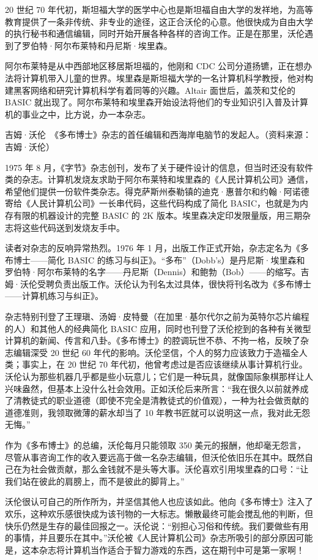 \documentclass[12pt,UTF8]{ctexbook}
\begin{document}
20 世纪 70 年代初，斯坦福大学的医学中心也是斯坦福自由大学的发祥地，为高等教育提供了一条非传统、非专业的途径，这正合沃伦的心意。他很快成为自由大学的执行秘书和通信编辑，同时开始开展各种各样的咨询工作。正是在那里，沃伦遇到了罗伯特·阿尔布莱特和丹尼斯·埃里森。

阿尔布莱特是从中西部地区移居斯坦福的，他刚和 CDC 公司分道扬镳，正在想办法将计算机带入儿童的世界。埃里森是斯坦福大学的一名计算机科学教授，他对构建黑客网络和研究计算机科学有着同等的兴趣。Altair 面世后，盖茨和艾伦的 BASIC 就出现了。阿尔布莱特和埃里森开始设法将他们的专业知识引入普及计算机的事业之中，比方说，办一本杂志。



吉姆·沃伦　《多布博士》杂志的首任编辑和西海岸电脑节的发起人。（资料来源：吉姆·沃伦）

1975 年 8 月，《字节》杂志创刊，发布了关于硬件设计的信息，但当时还没有软件类的杂志。计算机发烧友求助于阿尔布莱特和埃里森的《人民计算机公司》通信，希望他们提供一份软件类杂志。得克萨斯州泰勒镇的迪克·惠普尔和约翰·阿诺德寄给《人民计算机公司》一长串代码，这些代码构成了简化 BASIC，也就是为内存有限的机器设计的完整 BASIC 的 2K 版本。埃里森决定印发限量版，用三期杂志将这些代码送到发烧友手中。

读者对杂志的反响异常热烈。1976 年 1 月，出版工作正式开始，杂志定名为《多布博士——简化 BASIC 的练习与纠正》。“多布”（Dobb's）是丹尼斯·埃里森和罗伯特·阿尔布莱特的名字——丹尼斯（Dennis）和鲍勃（Bob）——的缩写。吉姆·沃伦受聘负责出版工作。沃伦认为刊名太过具体，很快将刊名改为《多布博士——计算机练习与纠正》。

杂志特别刊登了王理瑱、汤姆·皮特曼（在加里·基尔代尔之前为英特尔芯片编程的人）和其他人的经典简化 BASIC 应用，同时也刊登了沃伦挖到的各种有关微型计算机的新闻、传言和八卦。《多布博士》的腔调玩世不恭、不拘一格，反映了杂志编辑深受 20 世纪 60 年代的影响。沃伦坚信，个人的努力应该致力于造福全人类；事实上，在 20 世纪 70 年代初，他曾考虑过是否应该继续从事计算机行业。沃伦认为那些机器几乎都是些小玩意儿；它们是一种玩具，就像国际象棋那样让人兴味盎然，但基本上没什么社会效用。正如沃伦后来所言：“我在很久以前就养成了清教徒式的职业道德（即使不完全是清教徒式的价值观），一种为社会做贡献的道德准则，我领取微薄的薪水却当了 10 年教书匠就可以说明这一点，我对此无怨无悔。”

作为《多布博士》的总编，沃伦每月只能领取 350 美元的报酬，他却毫无怨言，尽管从事咨询工作的收入要远高于做一名杂志编辑，但沃伦依旧乐在其中。既然自己在为社会做贡献，那么金钱就不是头等大事。沃伦喜欢引用埃里森的口号：“让我们站在彼此的肩膀上，而不是彼此的脚背上。”

沃伦很认可自己的所作所为，并坚信其他人也应该如此。他向《多布博士》注入了欢乐，这种欢乐感很快成为该刊物的一大标志。懒散最终可能会搅乱他的判断，但快乐仍然是生存的最佳回报之一。沃伦说：“别担心习俗和传统。我们要做些有用的事情，并且要乐在其中。”沃伦被《人民计算机公司》杂志所吸引的部分原因可能是，这本杂志将计算机当作适合于智力游戏的东西，这在期刊中可是第一家啊！
\end{document}
